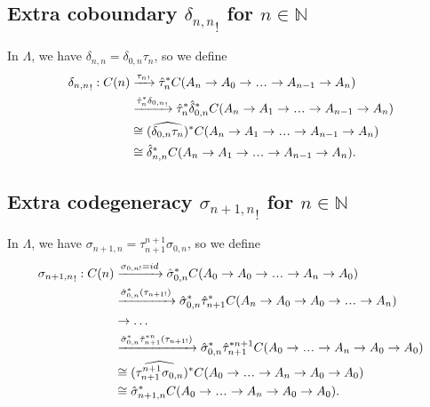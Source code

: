 \subsection{Extra coboundary 
  ${\delta_{n,n}}_!$ for 
  $n \in \mathbb{N}$}
In $\Lambda$, we have $\delta_{n,n} = 
\delta_{0,n}\tau_n$, so we define 
\begin{align*}
{{\delta}_{n,n}}_! : C(n)
& \xrightarrow{{\tau_n}_!}
\hat{\tau}_n^*
  C(A_n \to A_0 \to \smdots \to A_{n-1} \to A_n)\\
& \xrightarrow{\hat{\tau}_n^*{\delta_{0,n}}_!}
\hat{\tau}_n^*\hat{\delta}_{0,n}^*
  C(A_n \to A_1 \to \smdots \to A_{n-1} \to A_n) \\
&\cong
(\widehat{\delta_{0,n}\tau_n})^*
  C(A_n \to A_1 \to \smdots \to A_{n-1} \to A_n)\\
&\cong
\hat{\delta}_{n,n}^*
C(A_n \to A_1 \to \smdots \to A_{n-1} \to A_n).
\end{align*}

\subsection{Extra codegeneracy 
  ${\sigma_{n+1,n}}_!$ for 
  $n \in \mathbb{N}$}
In $\Lambda$, we have $\sigma_{n+1,n} = 
\tau_{n+1}^{n+1} \sigma_{0,n}$, so we define 
\begin{align*}
{{\sigma}_{n+1,n}}_! : C(n)
& \xrightarrow{\sigma_{0,n!} = id}
\hat{\sigma}_{0,n}^*
  C(A_0 \to A_0 \to \smdots \to A_n \to A_0)\\
& \xrightarrow{\hat{\sigma}_{0,n}^*(\tau_{n+1!})}
\hat{\sigma}_{0,n}^*\hat{\tau}_{n+1}^*
  C(A_n \to A_0 \to A_0 \to \smdots \to A_n) \\
& \to \dots \\
& \xrightarrow{\hat{\sigma}_{0,n}^*
  \hat{\tau}_{n+1}^{*n}(\tau_{n+1!})}
  \hat{\sigma}_{0,n}^*\hat{\tau}_{n+1}^{*n+1}
  C(A_0 \to \smdots \to A_n \to A_0 \to A_0) \\
&\cong
(\widehat{\tau_{n+1}^{n+1} \sigma_{0,n}})^*
  C(A_0 \to \smdots \to A_n \to A_0 \to A_0)\\
&\cong
\hat{\sigma}_{n+1,n}^*
C(A_0 \to \smdots \to A_n \to A_0 \to A_0).
\end{align*}
